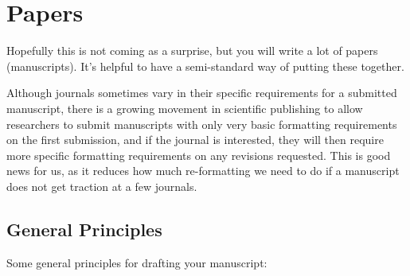 \documentclass[
  letterpaper,
  DIV=11,
  numbers=noendperiod]{scrreprt}
\begin{document}
\hypertarget{sec-papers}{%
\chapter{Papers}\label{sec-papers}}

Hopefully this is not coming as a surprise, but you will write a lot of
papers (manuscripts). It's helpful to have a semi-standard way of
putting these together.

\begin{tcolorbox}[enhanced jigsaw, colframe=quarto-callout-note-color-frame, opacityback=0, leftrule=.75mm, bottomrule=.15mm, rightrule=.15mm, left=2mm, toptitle=1mm, colback=white, bottomtitle=1mm, titlerule=0mm, title=\textcolor{quarto-callout-note-color}{\faInfo}\hspace{0.5em}{Note}, arc=.35mm, toprule=.15mm, breakable, coltitle=black, colbacktitle=quarto-callout-note-color!10!white, opacitybacktitle=0.6]

Although journals sometimes vary in their specific requirements for a
submitted manuscript, there is a growing movement in scientific
publishing to allow researchers to submit manuscripts with only very
basic formatting requirements on the first submission, and if the
journal is interested, they will then require more specific formatting
requirements on any revisions requested. This is good news for us, as it
reduces how much re-formatting we need to do if a manuscript does not
get traction at a few journals.

\end{tcolorbox}

\hypertarget{general-principles}{%
\section{General Principles}\label{general-principles}}

Some general principles for drafting your manuscript:
\end{document}
